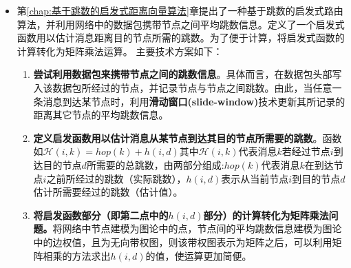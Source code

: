 \begin{itemize}
\item 第\ref{chap:基于跳数的启发式距离向量算法}章提出了一种基于跳数的启发式路由算法，并利用网络中的数据包携带节点之间平均跳数信息。定义了一个启发式函数用以估计消息距离目的节点所需的跳数。为了便于计算，将启发式函数的计算转化为矩阵乘法运算。
主要技术方案如下：
\begin{enumerate}
\item \textbf{尝试利用数据包来携带节点之间的跳数信息}。具体而言，在数据包头部写入该数据包所经过的节点，并记录节点与节点之间跳数。由此，当任意一条消息到达某节点时，利用\textbf{滑动窗口(slide-window)}技术更新其所记录的距离其它节点的平均跳数信息。

\item \textbf{定义启发函数用以估计消息从某节点到达其目的节点所需要的跳数}。函数如$
\label{eq:Hh}
\mathcal{H}(i,k) = hop(k) + h(i, d)
$其中$\mathcal{H}(i,k)$代表消息$k$若经过节点$i$到达目的节点$d$所需要的总跳数，由两部分组成:$hop(k)$代表消息$k$在到达节点$i$之前所经过的跳数（实际跳数），$h(i,d)$表示从当前节点$i$到目的节点$d$估计所需要经过的跳数（估计值）。

\item \textbf{将启发函数部分（即第二点中的$h(i,d)$部分）的计算转化为矩阵乘法问题。}将网络中节点建模为图论中的点，节点间的平均跳数信息建模为图论中的边权值，且为无向带权图，则该带权图表示为矩阵之后，可以利用矩阵相乘的方法求出$h(i,d)$的值，使运算更加简便。
\end{enumerate}
\end{itemize}